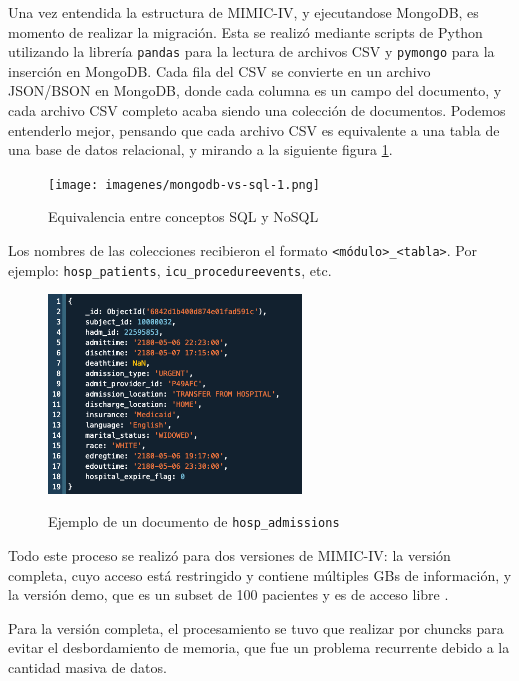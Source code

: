 Una vez entendida la estructura de MIMIC-IV, y ejecutandose MongoDB, es momento de realizar la migración. Esta se realizó mediante scripts de Python utilizando la librería \texttt{pandas} para la lectura de archivos CSV y \texttt{pymongo} para la inserción en MongoDB. Cada fila del CSV se convierte en un archivo JSON/BSON \cite{mongojsonbson} en MongoDB, donde cada columna es un campo del documento, y cada archivo CSV completo acaba siendo una colección de documentos. Podemos entenderlo mejor, pensando que cada archivo CSV es equivalente a una tabla de una base de datos relacional, y mirando a la siguiente figura \ref{fig:equivalenciasql}.

\begin{figure}[H]
  \centering
  {\texttt{[image: imagenes/mongodb-vs-sql-1.png]}}
  \caption{Equivalencia entre conceptos SQL y NoSQL}
  \label{fig:equivalenciasql}
\end{figure}

Los nombres de las colecciones recibieron el formato \texttt{\textless módulo\textgreater\_\textless tabla\textgreater}. Por ejemplo: \texttt{hosp\_patients}, \texttt{icu\_procedureevents}, etc.

\begin{figure}[H]
  \centering
  {\includegraphics[width=0.6\textwidth]{imagenes/ej_admission.png}}
  \caption{Ejemplo de un documento de \texttt{hosp\_admissions}}
  \label{fig:screenshot3}
\end{figure}

Todo este proceso se realizó para dos versiones de MIMIC-IV: la versión completa, cuyo acceso está restringido y contiene múltiples GBs de información, y la versión demo, que es un subset de 100 pacientes y es de acceso libre \cite{MIMICIV_Demo}.

Para la versión completa, el procesamiento se tuvo que realizar por chuncks para evitar el desbordamiento de memoria, que fue un problema recurrente debido a la cantidad masiva de datos.

